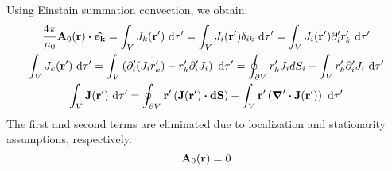 \documentclass{article}
\numberwithin{equation}{section}
\begin{document}
%
Using Einstain summation convection, we obtain:
%
\begin{gather}
    \frac{4\pi}{\mu_0} \vb{A}_0(\vb{r})\vdot \vu{e_k} = \int_V J_k(\vb{r'})\ \dd\tau'=\int_V J_i(\vb{r'}) \delta_{ik} \ \dd\tau'=\int_V J_i(\vb{r'}) \partial'_ir'_k \ \dd\tau'\nonumber \\ \int_V J_k(\vb{r'})\ \dd\tau'  = \int_V \left( \partial'_i(J_i r'_k) - r'_k \partial'_i J_i \right) \ \dd\tau' = \oint_{\partial V} r'_k J_i dS_i - \int_V r'_k \partial'_i J_i \ \dd\tau' \nonumber \\ \int_V \vb{J}(\vb{r'})\ \dd\tau'  = \oint_{\partial V} \vb{r'} \left( \vb{J}(\vb{r'}) \vdot \vb{dS} \right) - \int_V \vb{r'}\left( \grad'\vdot \vb{J}(\vb{r'}) \right) \ \dd\tau' \label{eqn:eq17}
\end{gather}
%
The first and second terms are eliminated due to localization and stationarity assumptions, respectively.
%
\begin{equation}
\label{eqn:eq18}
    \vb{A}_0(\vb{r})=0
\end{equation}
%
\end{document}
